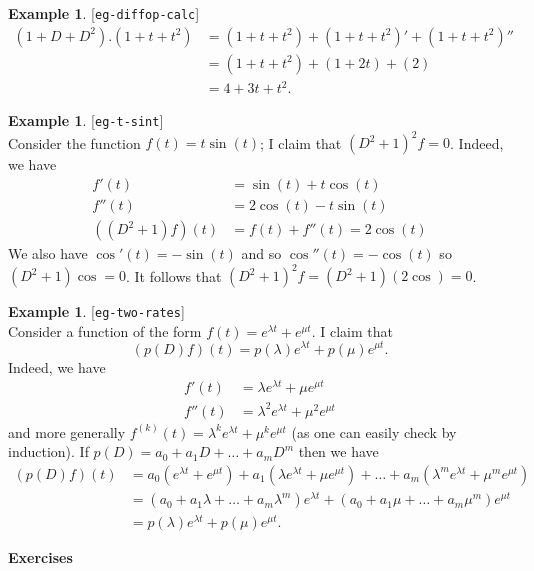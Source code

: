 \documentclass{amsart}
\newcommand{\lbl}[1]{\label{#1}\textup{[\texttt{#1}]}\ \\}
\newcommand{\lbl}{\label}
\newcommand{\lm}        {\lambda}
\renewcommand{\:}{\colon}
\theoremstyle{definition}
\newtheorem{example}[theorem]{Example}
\begin{document}
\begin{example}\lbl{eg-diffop-calc}
 \begin{align*}
  (1+D+D^2).(1+t+t^2) &= (1+t+t^2) + (1+t+t^2)' + (1+t+t^2)'' \\
                      &= (1+t+t^2) + (1+2t) + (2) \\
                      &= 4 + 3t + t^2.
 \end{align*}
\end{example}
\begin{example}\lbl{eg-t-sint}
 Consider the function $f(t)=t\sin(t)$; I claim that $(D^2+1)^2f=0$.
 Indeed, we have
 \begin{align*}
  f'(t)  &= \sin(t) + t\cos(t) \\
  f''(t) &= 2\cos(t) -t\sin(t) \\
  ((D^2+1)f)(t) &= f(t) + f''(t) = 2\cos(t)   
 \end{align*}
 We also have $\cos'(t)=-\sin(t)$ and so $\cos''(t)=-\cos(t)$ so
 $(D^2+1)\cos=0$.  It follows that $(D^2+1)^2f=(D^2+1)(2\cos)=0$.
\end{example}
\begin{example}\lbl{eg-two-rates}
 Consider a function of the form $f(t)=e^{\lm t}+e^{\mu t}$.  I claim
 that 
 \[ (p(D)f)(t) = p(\lm) e^{\lm t} + p(\mu) e^{\mu t}. \]
 Indeed, we have
 \begin{align*}
  f'(t)  &= \lm e^{\lm t}+\mu e^{\mu t} \\
  f''(t) &= \lm^2 e^{\lm t} + \mu^2 e^{\mu t}
 \end{align*}
 and more generally $f^{(k)}(t)=\lm^k e^{\lm t}+\mu^k e^{\mu t}$ (as
 one can easily check by induction).  If $p(D)=a_0+a_1D+\ldots+a_mD^m$
 then we have
 \begin{align*}
  (p(D)f)(t) &= a_0(e^{\lm t} + e^{\mu t}) +  
                a_1(\lm e^{\lm t} + \mu e^{\mu t}) + \ldots + 
                a_m(\lm^m e^{\lm t} +\mu^m e^{\mu t}) \\
             &= (a_0 + a_1\lm + \ldots + a_m\lm^m) e^{\lm t} + 
                (a_0 + a_1\mu + \ldots + a_m\mu^m) e^{\mu t} \\
             &= p(\lm) e^{\lm t} + p(\mu) e^{\mu t}.
 \end{align*}
\end{example}


\begin{center}
 \Large \textbf{Exercises}
\end{center}
\end{document}
